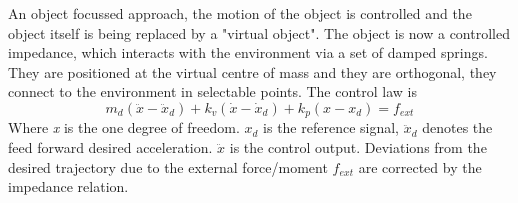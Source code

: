 \documentclass[conference]{IEEEtran}
\begin{document}
An object focussed approach, the motion of the object is controlled and the object itself is being replaced by a "virtual object". The object is now a controlled impedance, which interacts with the environment via a set of damped springs. They are positioned at the virtual centre of mass and they are orthogonal, they connect to the environment in selectable points. The control law is
\begin{equation}
m_d(\ddot{x}-\ddot{x}_d) + k_v(\dot{x}-\dot{x}_d) + k_p(x-x_d) = f_{ext}
\end{equation}
Where \textit{x} is the one degree of freedom. \textit{$ x_d $} is the reference signal, $ \ddot{x}_d $ denotes the feed forward desired acceleration. $ \ddot{x} $ is the control output. Deviations from the desired trajectory due to the external force/moment $ f_{ext} $ are corrected by the impedance relation.
\end{document}
